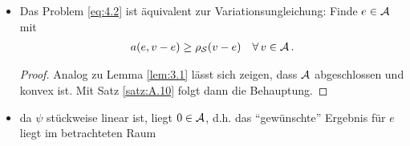 \begin{itemize}
\begin{proof}
Es sei $u$ die Lösung von \eqref{eq:3.2} und $u_{\mcal S}$ die Lösung von \eqref{eq:4.1}. Dann gilt
\begin{align*}\tag{$\ast$}
	 u \in K : \quad\qquad\quad \,\, \, \, \,  J(u)& \le J(\tilde v )\, \, \, \, \,  \qquad\qquad \forall \, \tilde v \in K \\
	\Llra u \in K : \quad J(u)-J(u_{\mcal S})& \le J(\tilde v) - J(u_{\mcal S}) \quad \forall \, \tilde v \in K \, .
\end{align*}
Wir rechnen für die linke Seite nach, dass gilt
\begin{align*}
	J(u)-J(u_{\mcal S}) & = \frac 1 2 a(u,u) - (f,u) -\(\frac 1 2 a(u_{\mcal S},u_{\mcal S}) - (f,u_{\mcal S})\) \\
	& = \frac 1 2 a(u,u)  + \frac 1 2 a(u_{\mcal S},u_{\mcal S}) - a(u_{\mcal S},u_{\mcal S}) - (f,u-u_{\mcal S}) \\
	& = \frac 1 2 a(u,u)  + \frac 1 2 a(u_{\mcal S},u_{\mcal S}) - a(u_{\mcal S},u) - ((f,u-u_{\mcal S})- a(u_{\mcal S},u-u_{\mcal S})) \\
	& = \frac 1 2a(u-u_{\mcal S},u-u_{\mcal S})- \rho_{\mcal S} (u-u_{\mcal S}) \\
	& = \frac 1 2 a(e,e)-\rho_{\mcal S} (e) = \mcal I(e) \, .
\end{align*}
Analog gilt für die rechte Seite $J(\tilde v ) - J(u_{\mcal S}) = \mcal I(\tilde v - u_{\mcal S})$. Mit $v \coloneqq \tilde v - u_{\mcal S}$ gilt $v \in \mcal A$ und damit ist ($*$) äquivalent zu: Finde $e \in \mcal A$, so dass
\[
	\mcal I(e) \le \mcal I(v) \quad \forall \, v \in\mcal A \, . \qedhere
\]
\end{proof}

\item
\begin{kor}
Das Problem \eqref{eq:4.2} ist äquivalent zur Variationsungleichung: Finde $e \in \mcal A$ mit
\begin{align}\label{eq:4.3}
	a(e,v-e) \ge \rho_{\mathcal S} (v-e) \quad \forall \, v \in \mathcal A \, .
\end{align}
\end{kor}

\begin{proof}
Analog zu Lemma \ref{lem:3.1} lässt sich zeigen, dass $\mathcal A$ abgeschlossen und konvex ist. Mit Satz \ref{satz:A.10} folgt dann die Behauptung.
\end{proof}

\item da $\psi$ stückweise linear ist, liegt $0 \in \mathcal A$, d.h. das "`gewünschte"' Ergebnis für $e$ liegt im betrachteten Raum


\end{itemize}
